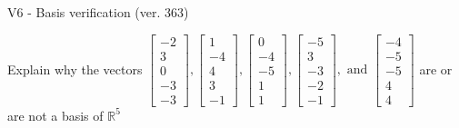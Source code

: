 \begin{exercise}
  \begin{exerciseTitle}V6 - Basis verification (ver. 363)\end{exerciseTitle}
  \begin{exerciseStatement}
    Explain why the vectors \(\left[\begin{array}{r}
-2 \\
3 \\
0 \\
-3 \\
-3
\end{array}\right] , \left[\begin{array}{r}
1 \\
-4 \\
4 \\
3 \\
-1
\end{array}\right] , \left[\begin{array}{r}
0 \\
-4 \\
-5 \\
1 \\
1
\end{array}\right] , \left[\begin{array}{r}
-5 \\
3 \\
-3 \\
-2 \\
-1
\end{array}\right] , \text{ and } \left[\begin{array}{r}
-4 \\
-5 \\
-5 \\
4 \\
4
\end{array}\right]\) are or are not a basis of \(\mathbb{R}^5\)	



\end{exerciseStatement}
\end{exercise}
